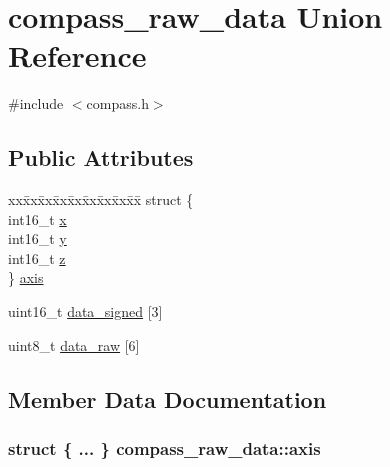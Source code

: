 \hypertarget{unioncompass__raw__data}{}\section{compass\+\_\+raw\+\_\+data Union Reference}
\label{unioncompass__raw__data}


{\ttfamily \#include $<$compass.\+h$>$}

\subsection*{Public Attributes}
\begin{DoxyCompactItemize}
\item 
\begin{tabbing}
xx\=xx\=xx\=xx\=xx\=xx\=xx\=xx\=xx\=\kill
struct \{\\
\>int16\_t \hyperlink{unioncompass__raw__data_abcb01e24cf0da22f4d89ea34b048e17c}{x}\\
\>int16\_t \hyperlink{unioncompass__raw__data_ab07fdca20a54692df8ff314d573c4313}{y}\\
\>int16\_t \hyperlink{unioncompass__raw__data_a489aa999829f2935717add753883667c}{z}\\
\} \hyperlink{unioncompass__raw__data_ae5fdba9f021adba1b201441884beee8f}{axis}\\

\end{tabbing}\item 
uint16\+\_\+t \hyperlink{unioncompass__raw__data_a597b0d6b3de62b99ee20496cc2919186}{data\+\_\+signed} \mbox{[}3\mbox{]}
\item 
uint8\+\_\+t \hyperlink{unioncompass__raw__data_a6e150d8de47f85ec9c6b0b3ef7c39f83}{data\+\_\+raw} \mbox{[}6\mbox{]}
\end{DoxyCompactItemize}


\subsection{Member Data Documentation}
\subsubsection[{\texorpdfstring{axis}{axis}}]{\setlength{\rightskip}{0pt plus 5cm}struct \{ ... \}   compass\+\_\+raw\+\_\+data\+::axis}\hypertarget{unioncompass__raw__data_ae5fdba9f021adba1b201441884beee8f}{}\label{unioncompass__raw__data_ae5fdba9f021adba1b201441884beee8f}
